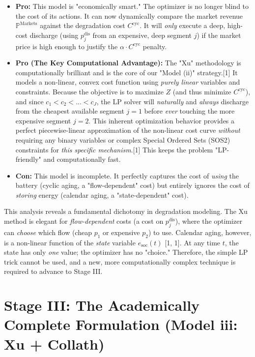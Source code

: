 \documentclass[11pt, a4paper]{article}
\begin{document}
\begin{itemize}
    \item \textbf{Pro:} This model is "economically smart." The optimizer is no longer blind to the cost of its actions. It can now dynamically compare the market revenue $\mathbb{P}^{\mathrm{Markets}}$ against the degradation cost $C^{\mathrm{cyc}}$. It will \textit{only} execute a deep, high-cost discharge (using $p^{\mathrm{dis}}_{j}$ from an expensive, deep segment $j$) if the market price is high enough to justify the $\alpha \cdot C^{\mathrm{cyc}}$ penalty.

    \item \textbf{Pro (The Key Computational Advantage):} The "Xu" methodology is computationally brilliant and is the core of our "Model (ii)" strategy.[1] It models a non-linear, convex cost function using \textit{purely linear} variables and constraints. Because the objective is to maximize $Z$ (and thus minimize $C^{\mathrm{cyc}}$), and since $c_1 < c_2 <... < c_J$, the LP solver will \textit{naturally} and \textit{always} discharge from the cheapest available segment $j=1$ before \textit{ever} touching the more expensive segment $j=2$. This inherent optimization behavior provides a perfect piecewise-linear approximation of the non-linear cost curve \textit{without} requiring any binary variables or complex Special Ordered Sets (SOS2) constraints for \textit{this specific mechanism}.[1] This keeps the problem "LP-friendly" and computationally fast.

    \item \textbf{Con:} This model is incomplete. It perfectly captures the cost of \textit{using} the battery (cyclic aging, a "flow-dependent" cost) but entirely ignores the cost of \textit{storing} energy (calendar aging, a "state-dependent" cost).
\end{itemize}

This analysis reveals a fundamental dichotomy in degradation modeling. The Xu method is elegant for \textit{flow-dependent} costs (a cost on $p^{\mathrm{dis}}_{j}$), where the optimizer can \textit{choose} which flow (cheap $p_1$ or expensive $p_2$) to use. Calendar aging, however, is a non-linear function of the \textit{state} variable $e_{\mathrm{soc}}(t)$ [1, 1]. At any time $t$, the state has only \textit{one} value; the optimizer has no "choice." Therefore, the simple LP trick cannot be used, and a new, more computationally complex technique is required to advance to Stage III.

\section{Stage III: The Academically Complete Formulation (Model iii: Xu + Collath)}
\end{document}
